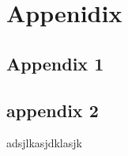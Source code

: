 \thispagestyle{empty}
    \newpage
    \appendix %
    \section{Appenidix}
    \subsection{Appendix 1}
    \subsection{appendix 2}
    adsjlkasjdklasjk